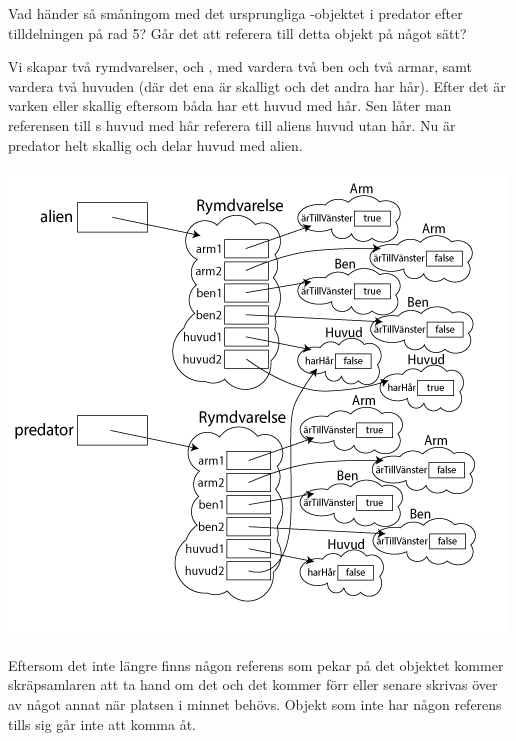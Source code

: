 \Subtask Vad händer så småningom med det ursprungliga -objektet i predator efter tilldelningen på rad 5? Går det att referera till detta objekt på något sätt?

\SOLUTION

\TaskSolved \what

\SubtaskSolved  Vi skapar två rymdvarelser,  och , med vardera två ben och två armar, samt vardera två huvuden (där det ena är skalligt och det andra har hår). Efter det är varken  eller  skallig eftersom båda har ett huvud med hår. Sen låter man referensen till s huvud med hår referera till aliens huvud utan hår. Nu är predator helt skallig och delar huvud med alien.

\includegraphics[scale=0.65]{../img/w06-solutions/2b}

\SubtaskSolved  Eftersom det inte längre finns någon referens som pekar på det objektet kommer skräpsamlaren att ta hand om det och det kommer förr eller senare skrivas över av något annat när platsen i minnet behövs. Objekt som inte har någon referens tills sig går inte att komma åt.

\QUESTEND





\QUESTBEGIN

\Task \label{task:Square} \what~

